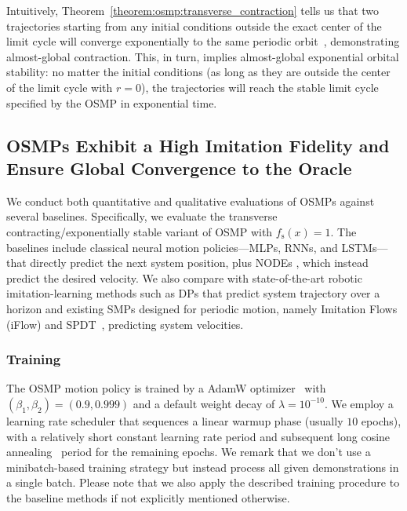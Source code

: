 Intuitively, Theorem~\ref{theorem:osmp:transverse_contraction} tells us that two trajectories starting from any initial conditions outside the exact center of the limit cycle will converge exponentially to the same periodic orbit~\citep{manchester2014transverse}, demonstrating almost-global contraction. This, in turn, implies almost-global exponential orbital stability: no matter the initial conditions (as long as they are outside the center of the limit cycle with $r = 0$), the trajectories will reach the stable limit cycle specified by the \gls{OSMP} in exponential time.

\subsection{OSMPs Exhibit a High Imitation Fidelity and Ensure Global Convergence to the Oracle}\label{sub:osmp:osmp_benchmarking}

We conduct both quantitative and qualitative evaluations of \glspl{OSMP} against several baselines. 
Specifically, we evaluate the transverse contracting/exponentially stable variant of \gls{OSMP} with $f_\mathrm{s}(x) = 1$.
The baselines include classical neural motion policies—\glspl{MLP}, \glspl{RNN}, and \glspl{LSTM}—that directly predict the next system position, plus \glspl{NODE} \citep{chen2018neural}, which instead predict the desired velocity. We also compare with state-of-the-art robotic imitation-learning methods such as \glspl{DP} that predict system trajectory over a horizon and existing \glspl{SMP} designed for periodic motion, namely Imitation Flows (iFlow) \citep{urain2020imitationflow} and \gls{SPDT}~\citep{zhi2024teaching}, predicting system velocities.

\subsubsection{Training}
The \gls{OSMP} motion policy is trained by a AdamW optimizer~\citep{kingma2014adam, loshchilov2018decoupled} with $(\beta_1, \beta_2) = (0.9, 0.999)$ and a default weight decay of $\lambda = 1 0^{-10}$.
We employ a learning rate scheduler that sequences a linear warmup phase (usually $10$ epochs), with a relatively short constant learning rate period and subsequent long cosine annealing~\citep{loshchilov2016sgdr} period for the remaining epochs. 
We remark that we don't use a minibatch-based training strategy but instead process all given demonstrations in a single batch.
Please note that we also apply the described training procedure to the baseline methods if not explicitly mentioned otherwise.

